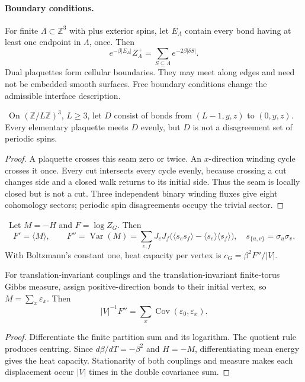\paragraph{Boundary conditions.}
For finite $\Lambda\subset\mathbb Z^3$ with plus exterior spins, let
$E_\Lambda$ contain every bond having at least one endpoint in $\Lambda$,
once. Then
\[
 e^{-\beta|E_\Lambda|}Z_\Lambda^+
 =\sum_{S\subseteq\Lambda}e^{-2\beta|\delta S|}.
\]
Dual plaquettes form cellular boundaries. They may meet along edges and
need not be embedded smooth surfaces. Free boundary conditions change
the admissible interface description.

\begin{proposition}
\ours\ On $(\mathbb Z/L\mathbb Z)^3$, $L\ge3$, let $D$ consist of bonds
from $(L-1,y,z)$ to $(0,y,z)$. Every elementary plaquette meets $D$
evenly, but $D$ is not a disagreement set of periodic spins.
\end{proposition}

\begin{proof}
A plaquette crosses this seam zero or twice. An $x$-direction winding
cycle crosses it once. Every cut intersects every cycle evenly,
because crossing a cut changes side and a closed walk returns to its
initial side. Thus the seam is locally closed but is not a cut.
Three independent binary winding fluxes give eight cohomology sectors;
periodic spin disagreements occupy the trivial sector.
\end{proof}

\begin{proposition}
\ours\ Let $M=-H$ and $F=\log Z_G$. Then
\[
 F'=\langle M\rangle,\qquad F''=\operatorname{Var}(M)
 =\sum_{e,f}J_eJ_f
  \bigl(\langle s_es_f\rangle-\langle s_e\rangle\langle s_f\rangle\bigr),
 \quad s_{\{u,v\}}=\sigma_u\sigma_v.
\]
With Boltzmann's constant one, heat capacity per vertex is
$c_G=\beta^2F''/|V|$.

For translation-invariant couplings and the translation-invariant
finite-torus Gibbs measure, assign positive-direction bonds to their
initial vertex, so $M=\sum_x\varepsilon_x$. Then
\[
 |V|^{-1}F''=\sum_x\operatorname{Cov}(\varepsilon_0,\varepsilon_x).
\]
\end{proposition}

\begin{proof}
Differentiate the finite partition sum and its logarithm. The quotient
rule produces centring. Since $d\beta/dT=-\beta^2$ and $H=-M$,
differentiating mean energy gives the heat capacity.
Stationarity of both couplings and measure makes each displacement
occur $|V|$ times in the double covariance sum.
\end{proof}

